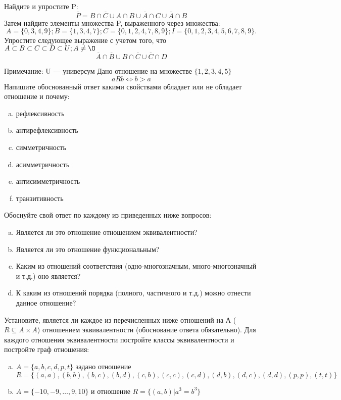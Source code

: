 \documentclass[10pt]{exam}
\begin{document}
\begin{questions}
\question
Найдите и упростите P:
\begin{equation*}
\overline{P} = B \cap \overline{C} \cup A \cap B \cup \overline{A} \cap C \cup \overline{A} \cap B
\end{equation*}
Затем найдите элементы множества P, выраженного через множества:
\begin{equation*}
A = \{0, 3, 4, 9\}; 
B = \{1, 3, 4, 7\};
C = \{0, 1, 2, 4, 7, 8, 9\};
I = \{0, 1, 2, 3, 4, 5, 6, 7, 8, 9\}.
\end{equation*}\question
Упростите следующее выражение с учетом того, что $A\subset B \subset C \subset D \subset U; A \neq \O$
\begin{equation*}
\overline{A} \cap \overline{B} \cup B \cap \overline{C} \cup \overline{C} \cap D
\end{equation*}

Примечание: U — универсум\question
Дано отношение на множестве $\{1, 2, 3, 4, 5\}$ 
\begin{equation*}
aRb \iff b > a
\end{equation*}
Напишите обоснованный ответ какими свойствами обладает или не обладает отношение и почему:   
\begin{enumerate} [a)]\setcounter{enumi}{0}
\item рефлексивность
\item антирефлексивность
\item симметричность
\item асимметричность
\item антисимметричность
\item транзитивность
\end{enumerate}

Обоснуйте свой ответ по каждому из приведенных ниже вопросов:
\begin{enumerate} [a)]\setcounter{enumi}{0}
    \item Является ли это отношение отношением эквивалентности?
    \item Является ли это отношение функциональным?
    \item Каким из отношений соответствия (одно-многозначным, много-многозначный и т.д.) оно является?
    \item К каким из отношений порядка (полного, частичного и т.д.) можно отнести данное отношение?
\end{enumerate}

\question
Установите, является ли каждое из перечисленных ниже отношений на А ($R \subseteq A \times A$) отношением эквивалентности (обоснование ответа обязательно). Для каждого отношения эквивалентности постройте классы 
эквивалентности и постройте граф отношения:
\begin{enumerate} [a)]\setcounter{enumi}{0}
\item $A = \{a, b, c, d, p, t\}$ задано отношение $R = \{(a, a), (b, b), (b, c), (b, d), (c, b), (c, c), (c, d), (d, b), (d, c), (d, d), (p,p), (t,t)\}$
\item $A = \{-10, -9, … , 9, 10\}$ и отношение $R = \{(a,b)|a^{3} = b^{3}\}$


\end{enumerate}
\end{questions}
\end{document}
